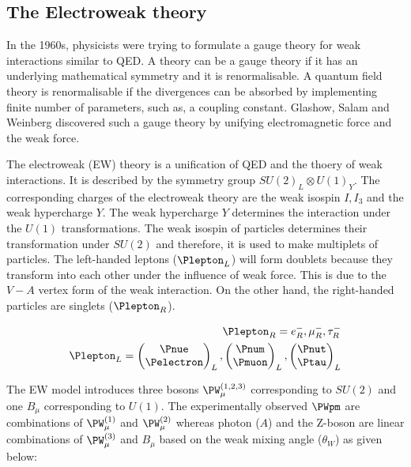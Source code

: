 \subsection{The Electroweak theory}
\label{sec:ewtheory}
In the 1960s, physicists were trying to formulate a gauge theory for weak interactions
similar to QED. A theory can be a gauge theory if it has an underlying mathematical symmetry
and it is renormalisable. A quantum field theory is renormalisable if the divergences can be absorbed
by implementing finite number of parameters, such as, a coupling constant. Glashow,
Salam and Weinberg discovered such a gauge theory by unifying electromagnetic force and 
the weak force.

The electroweak (EW) theory is a unification of QED and the thoery of weak interactions. 
It is described by the symmetry group $SU(2)_L \otimes U(1)_Y$. The corresponding
charges of the electroweak theory are the weak isospin $I,I_3$ and the weak hypercharge $Y$.
The weak hypercharge $Y$ determines the interaction under the $U(1)$ transformations.
The weak isospin of particles determines their transformation under $SU(2)$ and therefore, it is
used to make multiplets of particles. The left-handed leptons ($\Plepton_L$) will form doublets
because they transform into each other under the influence of weak force. 
This is due to the $V-A$ vertex form of the weak interaction. On the other hand, the right-handed 
particles are singlets ($\Plepton_R$). 

\begin{align}
    \Plepton_R = e^{-}_R, \mu^{-}_R, \tau^{-}_R \\
    \Plepton_L = \begin{pmatrix} \Pnue \\ \Pelectron \end{pmatrix}_L , \begin{pmatrix} \Pnum \\ \Pmuon \end{pmatrix}_L , \begin{pmatrix} \Pnut \\ \Ptau \end{pmatrix}_L 
\end{align}

The EW model introduces three bosons $\PW_\mu^{(1,2,3)}$ corresponding
to $SU(2)$ and one $B_\mu$ corresponding to $U(1)$. The experimentally observed $\PWpm$
are combinations of $\PW_\mu^{(1)}$ and $\PW_\mu^{(2)}$ whereas photon ($A$) and the Z-boson are linear
combinations of $\PW_\mu^{(3)}$ and $B_\mu$ based on the weak mixing angle ($\theta_W$)
as given below:

